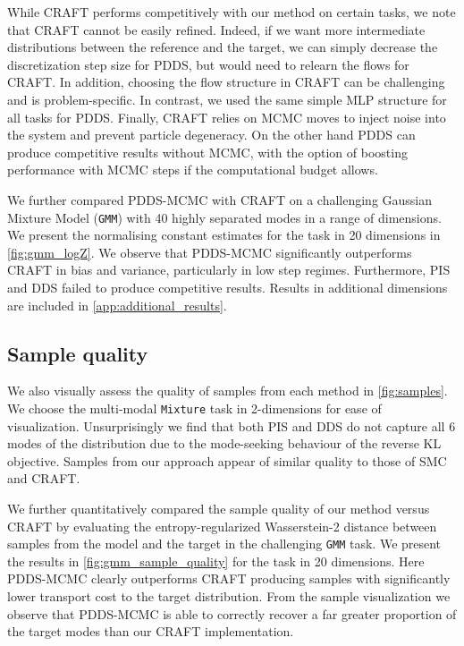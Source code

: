 \documentclass{article}
\theoremstyle{plain}
\theoremstyle{definition}
\theoremstyle{remark}
\begin{document}
While CRAFT performs competitively with our method on certain tasks, we note that CRAFT cannot be easily refined. Indeed, if we want more intermediate distributions between the reference and the target, we can simply decrease the discretization step size for PDDS, but would need to relearn the flows for CRAFT. In addition, choosing the flow structure in CRAFT can be challenging and is problem-specific. In contrast, we used the same simple MLP structure for all tasks for PDDS. Finally, CRAFT relies on MCMC moves to inject noise into the system and prevent particle degeneracy. On the other hand PDDS can produce competitive results without MCMC, with the option of boosting performance with MCMC steps if the computational budget allows.

We further compared PDDS-MCMC with CRAFT on a challenging Gaussian Mixture Model (\verb|GMM|) with 40 highly separated modes \citep{midgley2022flow} in a range of dimensions. We present the normalising constant estimates for the task in 20 dimensions in \cref{fig:gmm_logZ}. We observe that PDDS-MCMC significantly outperforms CRAFT in bias and variance, particularly in low step regimes. Furthermore, PIS and DDS failed to produce competitive results. Results in additional dimensions are included in \cref{app:additional_results}.

\subsection{Sample quality}

We also visually assess the quality of samples from each method in \cref{fig:samples}. We choose the multi-modal \verb|Mixture| task in 2-dimensions for ease of visualization. Unsurprisingly we find that both PIS and DDS do not capture all 6 modes of the distribution due to the mode-seeking behaviour of the reverse KL objective. Samples from our approach appear of similar quality to those of SMC and CRAFT.

We further quantitatively compared the sample quality of our method versus CRAFT by evaluating the entropy-regularized Wasserstein-2 distance between samples from the model and the target in the challenging \verb|GMM| task. We present the results in \cref{fig:gmm_sample_quality} for the task in 20 dimensions. Here PDDS-MCMC clearly outperforms CRAFT producing samples with significantly lower transport cost to the target distribution. From the sample visualization we observe that PDDS-MCMC is able to correctly recover a far greater proportion of the target modes than our CRAFT implementation.
\end{document}
